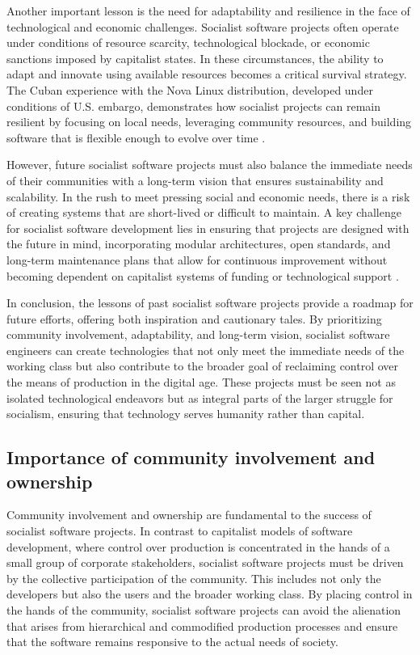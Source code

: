 \begin{refsection}
Another important lesson is the need for adaptability and resilience in the face of technological and economic challenges. Socialist software projects often operate under conditions of resource scarcity, technological blockade, or economic sanctions imposed by capitalist states. In these circumstances, the ability to adapt and innovate using available resources becomes a critical survival strategy. The Cuban experience with the Nova Linux distribution, developed under conditions of U.S. embargo, demonstrates how socialist projects can remain resilient by focusing on local needs, leveraging community resources, and building software that is flexible enough to evolve over time \cite[pp.~73-76]{ernesto1968}.

However, future socialist software projects must also balance the immediate needs of their communities with a long-term vision that ensures sustainability and scalability. In the rush to meet pressing social and economic needs, there is a risk of creating systems that are short-lived or difficult to maintain. A key challenge for socialist software development lies in ensuring that projects are designed with the future in mind, incorporating modular architectures, open standards, and long-term maintenance plans that allow for continuous improvement without becoming dependent on capitalist systems of funding or technological support \cite[pp.~145-149]{raymond2022}.

In conclusion, the lessons of past socialist software projects provide a roadmap for future efforts, offering both inspiration and cautionary tales. By prioritizing community involvement, adaptability, and long-term vision, socialist software engineers can create technologies that not only meet the immediate needs of the working class but also contribute to the broader goal of reclaiming control over the means of production in the digital age. These projects must be seen not as isolated technological endeavors but as integral parts of the larger struggle for socialism, ensuring that technology serves humanity rather than capital.

\subsection{Importance of community involvement and ownership}

Community involvement and ownership are fundamental to the success of socialist software projects. In contrast to capitalist models of software development, where control over production is concentrated in the hands of a small group of corporate stakeholders, socialist software projects must be driven by the collective participation of the community. This includes not only the developers but also the users and the broader working class. By placing control in the hands of the community, socialist software projects can avoid the alienation that arises from hierarchical and commodified production processes and ensure that the software remains responsive to the actual needs of society.


\end{refsection}
